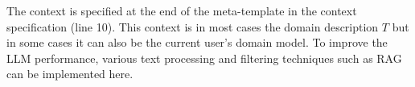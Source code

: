 The context is specified at the end of the meta-template in the context specification (line 10). This context is in most cases the domain description $T$ but in some cases it can also be the current user's domain model. To improve the LLM performance, various text processing and filtering techniques such as RAG can be implemented here.